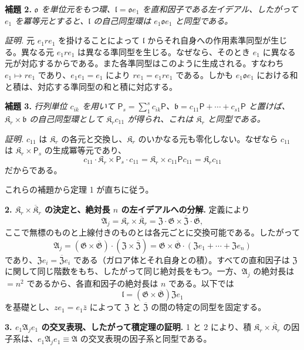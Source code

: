 \noindent\textbf{補題 2.} \emph{\(\mathfrak o\) を単位元をもつ環、\(\mathfrak l=\mathfrak o e_1\) を直和因子である左イデアル、したがって \(e_1\) を冪等元とすると、\(\mathfrak l\) の自己同型環は \(e_1\mathfrak o e_1\) と同型である。}

\noindent\emph{証明.} 元 \(e_1re_1\) を掛けることによって \(\mathfrak l\) からそれ自身への作用素準同型が生じる。異なる元 \(e_1re_1\) は異なる準同型を生じる。なぜなら、そのとき \(e_1\) に異なる元が対応するからである。また各準同型はこのように生成される。すなわち \(e_1\mapsto re_1\) であり、\(e_1e_1=e_1\) により \(re_1=e_1re_1\) である。しかも \(e_1\mathfrak o e_1\) における和と積は、対応する準同型の和と積に対応する。

\noindent\textbf{補題 3.} \emph{行列単位 \(c_{ik}\) を用いて \(\mathsf P_s=\sum_1^s c_{ik}\mathsf P\)、\(\mathfrak b=c_{11}\mathsf P+\cdots+c_{s1}\mathsf P\) と置けば、\(\mathfrak K_r\times\mathfrak b\) の自己同型環として \(\mathfrak K_rc_{11}\) が得られ、これは \(\mathfrak K_r\) と同型である。}

\noindent\emph{証明.} \(c_{11}\) は \(\mathfrak K_r\) の各元と交換し、\(\mathfrak K_r\) のいかなる元も零化しない。なぜなら \(c_{11}\) は \(\mathfrak K_r\times\mathsf P_s\) の生成冪等元であり、
\[
c_{11}\cdot\mathfrak K_r\times\mathsf P_s\cdot c_{11}
=\mathfrak K_r\times c_{11}\mathsf Pc_{11}
=\mathfrak K_rc_{11}
\]
だからである。

これらの補題から定理 1 が直ちに従う。

\noindent\textbf{2. \(\mathfrak K_r\times\overline{\mathfrak K}_r\) の決定と、絶対長 \(n\) の左イデアルへの分解.} 定義により
\[
\mathfrak A_j=\mathfrak K_r\times\overline{\mathfrak K}_r
=\mathfrak Z\cdot\mathfrak G\times\overline{\mathfrak Z}\cdot\overline{\mathfrak G},
\]
ここで無標のものと上線付きのものとは各元ごとに交換可能である。したがって
\[
\mathfrak A_j
=(\mathfrak G\times\overline{\mathfrak G})\cdot
(\mathfrak Z\times\overline{\mathfrak Z})
=\mathfrak G\times\overline{\mathfrak G}\cdot
(\mathfrak Ze_1+\cdots+\mathfrak Ze_n)
\]
であり、\(\mathfrak Ze_i=\overline{\mathfrak Z}e_i\) である（ガロア体とそれ自身との積）。すべての直和因子は \(\mathfrak Z\) に関して同じ階数をもち、したがって同じ絶対長をもつ。一方、\(\mathfrak A_j\) の絶対長は \(=n^2\) であるから、各直和因子の絶対長は \(n\) である。以下では
\[
\mathfrak l=(\mathfrak G\times\overline{\mathfrak G})\mathfrak Ze_1
\]
を基礎とし、\(ze_1=e_1\bar z\) によって \(\mathfrak Z\) と \(\overline{\mathfrak Z}\) の間の特定の同型を固定する。

\noindent\textbf{3. \(e_1\mathfrak A_je_1\) の交叉表現、したがって積定理の証明.} 1 と 2 により、積 \(\mathfrak K_r\times\overline{\mathfrak K}_r\) の因子系は、\(e_1\mathfrak A_je_1\equiv\mathfrak A\) の交叉表現の因子系と同型である。

